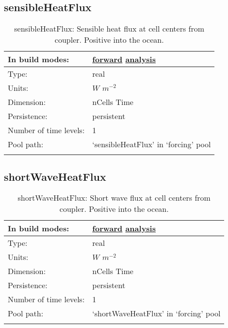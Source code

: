 \subsection[sensibleHeatFlux]{sensibleHeatFlux}
\label{subsec:var_sec_forcing_sensibleHeatFlux}
\begin{center}
\begin{longtable}{| p{2.0in} | p{4.0in} |}
        \hline 
        In build modes: & \hyperref[subsec:forward_var_tab_forcing]{forward} \hyperref[subsec:analysis_var_tab_forcing]{analysis} \\
        \hline 
        Type: & real \\
        \hline 
        Units: & $W$ $m^{-2}$ \\
        \hline 
        Dimension: & nCells Time \\
        \hline 
        Persistence: & persistent \\
        \hline 
        Number of time levels: & 1 \\
        \hline 
            Pool path: & `sensibleHeatFlux' in `forcing' pool \\
		 \hline 
    \caption{sensibleHeatFlux: Sensible heat flux at cell centers from coupler. Positive into the ocean.}
\end{longtable}
\end{center}
\subsection[shortWaveHeatFlux]{shortWaveHeatFlux}
\label{subsec:var_sec_forcing_shortWaveHeatFlux}
\begin{center}
\begin{longtable}{| p{2.0in} | p{4.0in} |}
        \hline 
        In build modes: & \hyperref[subsec:forward_var_tab_forcing]{forward} \hyperref[subsec:analysis_var_tab_forcing]{analysis} \\
        \hline 
        Type: & real \\
        \hline 
        Units: & $W$ $m^{-2}$ \\
        \hline 
        Dimension: & nCells Time \\
        \hline 
        Persistence: & persistent \\
        \hline 
        Number of time levels: & 1 \\
        \hline 
            Pool path: & `shortWaveHeatFlux' in `forcing' pool \\
		 \hline 
    \caption{shortWaveHeatFlux: Short wave flux at cell centers from coupler. Positive into the ocean.}
\end{longtable}
\end{center}
